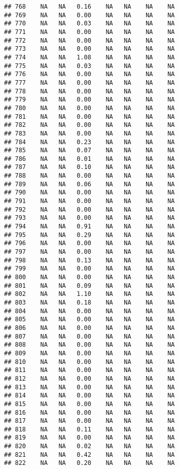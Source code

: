 \documentclass{article}\usepackage{graphicx, color}
\makeatletter
\newenvironment{kframe}{%
 \def\at@end@of@kframe{}%
 \ifinner\ifhmode%
  \def\at@end@of@kframe{\end{minipage}}%
  \begin{minipage}{\columnwidth}%
 \fi\fi%
 \def\FrameCommand##1{\hskip\@totalleftmargin \hskip-\fboxsep
 \colorbox{shadecolor}{##1}\hskip-\fboxsep
     \hskip-\linewidth \hskip-\@totalleftmargin \hskip\columnwidth}%
 \MakeFramed {\advance\hsize-\width
   \@totalleftmargin\z@ \linewidth\hsize
   \@setminipage}}%
 {\par\unskip\endMakeFramed%
 \at@end@of@kframe}
\newenvironment{knitrout}{}{} %
\makeatother
\begin{document}
\begin{knitrout}
\begin{kframe}
\begin{verbatim}
## 768    NA   NA   0.16    NA   NA    NA    NA
## 769    NA   NA   0.00    NA   NA    NA    NA
## 770    NA   NA   0.03    NA   NA    NA    NA
## 771    NA   NA   0.00    NA   NA    NA    NA
## 772    NA   NA   0.00    NA   NA    NA    NA
## 773    NA   NA   0.00    NA   NA    NA    NA
## 774    NA   NA   1.08    NA   NA    NA    NA
## 775    NA   NA   0.03    NA   NA    NA    NA
## 776    NA   NA   0.00    NA   NA    NA    NA
## 777    NA   NA   0.00    NA   NA    NA    NA
## 778    NA   NA   0.00    NA   NA    NA    NA
## 779    NA   NA   0.00    NA   NA    NA    NA
## 780    NA   NA   0.00    NA   NA    NA    NA
## 781    NA   NA   0.00    NA   NA    NA    NA
## 782    NA   NA   0.00    NA   NA    NA    NA
## 783    NA   NA   0.00    NA   NA    NA    NA
## 784    NA   NA   0.23    NA   NA    NA    NA
## 785    NA   NA   0.07    NA   NA    NA    NA
## 786    NA   NA   0.01    NA   NA    NA    NA
## 787    NA   NA   0.10    NA   NA    NA    NA
## 788    NA   NA   0.00    NA   NA    NA    NA
## 789    NA   NA   0.06    NA   NA    NA    NA
## 790    NA   NA   0.00    NA   NA    NA    NA
## 791    NA   NA   0.00    NA   NA    NA    NA
## 792    NA   NA   0.00    NA   NA    NA    NA
## 793    NA   NA   0.00    NA   NA    NA    NA
## 794    NA   NA   0.91    NA   NA    NA    NA
## 795    NA   NA   0.29    NA   NA    NA    NA
## 796    NA   NA   0.00    NA   NA    NA    NA
## 797    NA   NA   0.00    NA   NA    NA    NA
## 798    NA   NA   0.13    NA   NA    NA    NA
## 799    NA   NA   0.00    NA   NA    NA    NA
## 800    NA   NA   0.00    NA   NA    NA    NA
## 801    NA   NA   0.09    NA   NA    NA    NA
## 802    NA   NA   1.10    NA   NA    NA    NA
## 803    NA   NA   0.18    NA   NA    NA    NA
## 804    NA   NA   0.00    NA   NA    NA    NA
## 805    NA   NA   0.00    NA   NA    NA    NA
## 806    NA   NA   0.00    NA   NA    NA    NA
## 807    NA   NA   0.00    NA   NA    NA    NA
## 808    NA   NA   0.00    NA   NA    NA    NA
## 809    NA   NA   0.00    NA   NA    NA    NA
## 810    NA   NA   0.00    NA   NA    NA    NA
## 811    NA   NA   0.00    NA   NA    NA    NA
## 812    NA   NA   0.00    NA   NA    NA    NA
## 813    NA   NA   0.00    NA   NA    NA    NA
## 814    NA   NA   0.00    NA   NA    NA    NA
## 815    NA   NA   0.00    NA   NA    NA    NA
## 816    NA   NA   0.00    NA   NA    NA    NA
## 817    NA   NA   0.00    NA   NA    NA    NA
## 818    NA   NA   0.11    NA   NA    NA    NA
## 819    NA   NA   0.00    NA   NA    NA    NA
## 820    NA   NA   0.02    NA   NA    NA    NA
## 821    NA   NA   0.42    NA   NA    NA    NA
## 822    NA   NA   0.20    NA   NA    NA    NA

\end{verbatim}
\end{kframe}
\end{knitrout}
\end{document}
